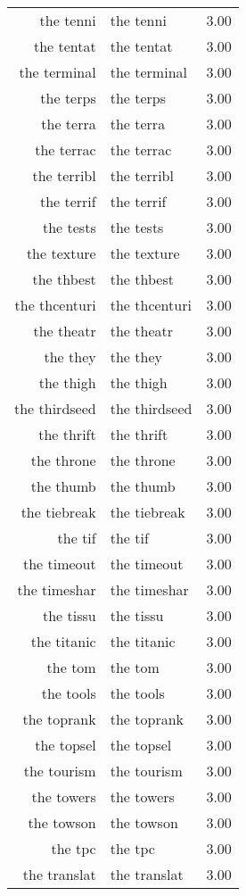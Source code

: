 \begin{table}[ht]
\begin{tabular}{rlr}
  the tenni & the tenni & 3.00 \\ 
  the tentat & the tentat & 3.00 \\ 
  the terminal & the terminal & 3.00 \\ 
  the terps & the terps & 3.00 \\ 
  the terra & the terra & 3.00 \\ 
  the terrac & the terrac & 3.00 \\ 
  the terribl & the terribl & 3.00 \\ 
  the terrif & the terrif & 3.00 \\ 
  the tests & the tests & 3.00 \\ 
  the texture & the texture & 3.00 \\ 
  the thbest & the thbest & 3.00 \\ 
  the thcenturi & the thcenturi & 3.00 \\ 
  the theatr & the theatr & 3.00 \\ 
  the they & the they & 3.00 \\ 
  the thigh & the thigh & 3.00 \\ 
  the thirdseed & the thirdseed & 3.00 \\ 
  the thrift & the thrift & 3.00 \\ 
  the throne & the throne & 3.00 \\ 
  the thumb & the thumb & 3.00 \\ 
  the tiebreak & the tiebreak & 3.00 \\ 
  the tif & the tif & 3.00 \\ 
  the timeout & the timeout & 3.00 \\ 
  the timeshar & the timeshar & 3.00 \\ 
  the tissu & the tissu & 3.00 \\ 
  the titanic & the titanic & 3.00 \\ 
  the tom & the tom & 3.00 \\ 
  the tools & the tools & 3.00 \\ 
  the toprank & the toprank & 3.00 \\ 
  the topsel & the topsel & 3.00 \\ 
  the tourism & the tourism & 3.00 \\ 
  the towers & the towers & 3.00 \\ 
  the towson & the towson & 3.00 \\ 
  the tpc & the tpc & 3.00 \\ 
  the translat & the translat & 3.00 \\ 

\end{tabular}
\end{table}
